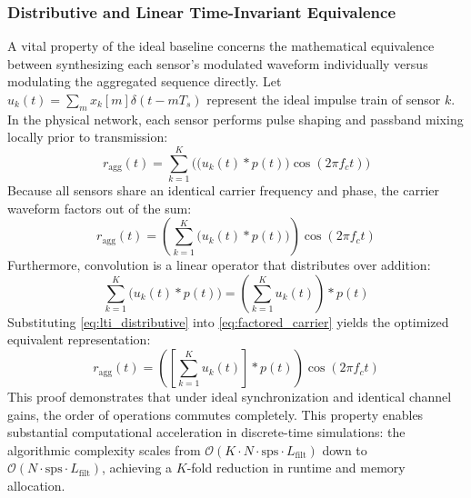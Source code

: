 \documentclass[Markos_Delaportas_1316.tex]{subfiles}
\begin{document}
\subsubsection{Distributive and Linear Time-Invariant Equivalence}
\label{subsubsec:distributive_lti_proof}
A vital property of the ideal baseline concerns the mathematical
equivalence between synthesizing each sensor's modulated waveform
individually versus modulating the aggregated sequence directly. Let
$u_k(t) = \sum_m x_k[m] \delta(t - m T_s)$ represent the
ideal impulse train of sensor $k$. In the physical network, each
sensor performs pulse shaping and passband mixing locally prior
to transmission:
\begin{equation}
    r_{\text{agg}}(t) = \sum_{k=1}^K \Big( \big( u_k(t) * p(t) \big)
    \cos(2\pi f_c t) \Big)
    \label{eq:per_sensor_pipeline}
\end{equation}
Because all sensors share an identical carrier frequency and phase,
the carrier waveform factors out of the sum:
\begin{equation}
    r_{\text{agg}}(t) = \left( \sum_{k=1}^K \big( u_k(t) * p(t) \big)
    \right) \cos(2\pi f_c t)
    \label{eq:factored_carrier}
\end{equation}
Furthermore, convolution is a linear operator that distributes over addition:
\begin{equation}
    \sum_{k=1}^K \big( u_k(t) * p(t) \big) = \left( \sum_{k=1}^K
    u_k(t) \right) * p(t)
    \label{eq:lti_distributive}
\end{equation}
Substituting \cref{eq:lti_distributive} into
\cref{eq:factored_carrier} yields the optimized equivalent representation:
\begin{equation}
    r_{\text{agg}}(t) = \left( \left[ \sum_{k=1}^K u_k(t) \right] *
    p(t) \right) \cos(2\pi f_c t)
    \label{eq:optimized_equivalent_pipeline}
\end{equation}
This proof demonstrates that under ideal synchronization and
identical channel gains, the order of operations commutes
completely. This property enables substantial computational
acceleration in discrete-time simulations: the algorithmic complexity
scales from $\mathcal{O}(K \cdot N \cdot \text{sps} \cdot
L_{\text{filt}})$ down to $\mathcal{O}(N \cdot \text{sps} \cdot
L_{\text{filt}})$,
achieving a $K$-fold reduction in runtime and memory allocation.
\end{document}

